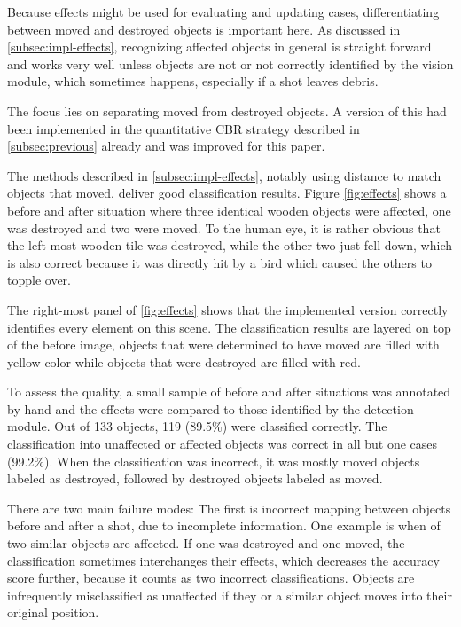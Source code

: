 Because effects might be used for evaluating and updating cases, differentiating between moved and destroyed objects is important here.
As discussed in \ref{subsec:impl-effects}, recognizing affected objects in general is straight forward and works very well unless objects are not or not correctly identified by the vision module, which sometimes happens, especially if a shot leaves debris.

The focus lies on separating moved from destroyed objects.
A version of this had been implemented in the quantitative \ac{CBR} strategy described in \ref{subsec:previous} already and was improved for this paper.

The methods described in \ref{subsec:impl-effects}, notably using distance to match objects that moved, deliver good classification results. Figure \ref{fig:effects} shows a before and after situation where three identical wooden objects were affected, one was destroyed and two were moved.
To the human eye, it is rather obvious that the left-most wooden tile was destroyed, while the other two just fell down, which is also correct because it was directly hit by a bird which caused the others to topple over.

The right-most panel of \ref{fig:effects} shows that the implemented version correctly identifies every element on this scene.
The classification results are layered on top of the before image, objects that were determined to have moved are filled with yellow color while objects that were destroyed are filled with red.

To assess the quality, a small sample of before and after situations was annotated by hand and the effects were compared to those identified by the detection module. Out of 133 objects, 119 (89.5\%) were classified correctly. The classification into unaffected or affected objects was correct in all but one cases (99.2\%).
When the classification was incorrect, it was mostly moved objects labeled as destroyed, followed by destroyed objects labeled as moved.

There are two main failure modes: The first is incorrect mapping between objects before and after a shot, due to incomplete information. One example is when of two similar objects are affected. If one was destroyed and one moved, the classification sometimes interchanges their effects, which decreases the accuracy score further, because it counts as two incorrect classifications.
Objects are infrequently misclassified as unaffected if they or a similar object moves into their original position.

